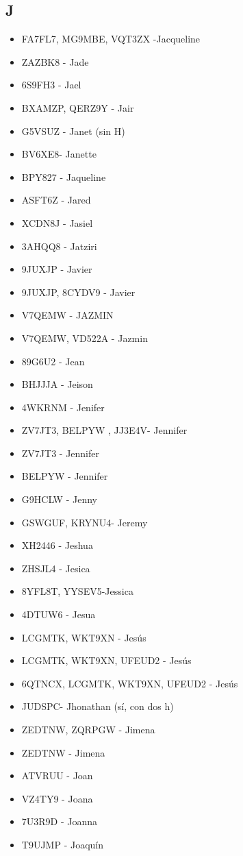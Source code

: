 \subsection*{J}
\begin{itemize}[leftmargin=*,nosep]
\item FA7FL7, MG9MBE, VQT3ZX -Jacqueline
\item ZAZBK8 - Jade
\item 6S9FH3 - Jael
\item BXAMZP, QERZ9Y - Jair
\item G5VSUZ - Janet (sin H)
\item BV6XE8- Janette
\item BPY827 - Jaqueline
\item ASFT6Z - Jared
\item XCDN8J - Jasiel
\item 3AHQQ8 - Jatziri
\item 9JUXJP - Javier
\item 9JUXJP, 8CYDV9 - Javier
\item V7QEMW - JAZMIN
\item V7QEMW, VD522A - Jazmin
\item 89G6U2 - Jean
\item BHJJJA - Jeison
\item 4WKRNM - Jenifer
\item ZV7JT3, BELPYW , JJ3E4V- Jennifer
\item ZV7JT3 - Jennifer
\item BELPYW - Jennifer
\item G9HCLW - Jenny
\item GSWGUF, KRYNU4- Jeremy
\item XH2446 - Jeshua
\item ZHSJL4 - Jesica
\item 8YFL8T, YYSEV5-Jessica
\item 4DTUW6 - Jesua
\item LCGMTK, WKT9XN - Jesús
\item LCGMTK, WKT9XN, UFEUD2 - Jesús
\item 6QTNCX, LCGMTK, WKT9XN, UFEUD2 - Jesús
\item JUDSPC- Jhonathan (sí, con dos h)
\item ZEDTNW, ZQRPGW - Jimena
\item ZEDTNW - Jimena
\item ATVRUU - Joan
\item VZ4TY9 - Joana
\item 7U3R9D - Joanna
\item T9UJMP - Joaquín

\end{itemize}
